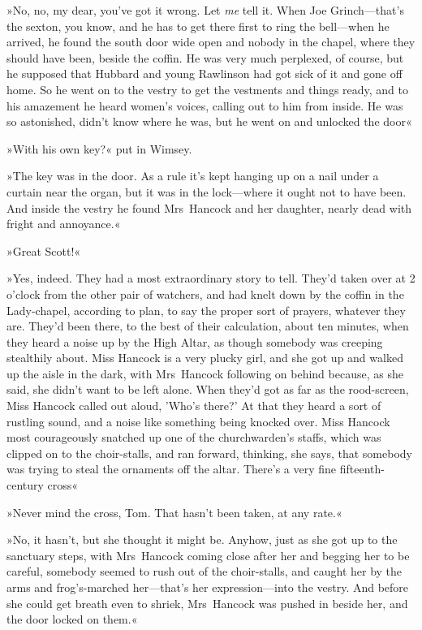 »No, no, my dear, you've got it wrong. Let \textit{me} tell it. When Joe Grinch—that's the sexton, you know, and he has to get there first to ring the bell—when he arrived, he found the south door wide open and nobody in the chapel, where they should have been, beside the coffin. He was very much perplexed, of course, but he supposed that Hubbard and young Rawlinson had got sick of it and gone off home. So he went on to the vestry to get the vestments and things ready, and to his amazement he heard women's voices, calling out to him from inside. He was so astonished, didn't know where he was, but he went on and unlocked the door\longdash«

»With his own key?« put in Wimsey.

»The key was in the door. As a rule it's kept hanging up on a nail under a curtain near the organ, but it was in the lock—where it ought not to have been. And inside the vestry he found Mrs~Hancock and her daughter, nearly dead with fright and annoyance.«

»Great Scott!«

»Yes, indeed. They had a most extraordinary story to tell. They'd taken over at 2 o'clock from the other pair of watchers, and had knelt down by the coffin in the Lady-chapel, according to plan, to say the proper sort of prayers, whatever they are. They'd been there, to the best of their calculation, about ten minutes, when they heard a noise up by the High Altar, as though somebody was creeping stealthily about. Miss Hancock is a very plucky girl, and she got up and walked up the aisle in the dark, with Mrs~Hancock following on behind because, as she said, she didn't want to be left alone. When they'd got as far as the rood-screen, Miss Hancock called out aloud, 'Who's there?' At that they heard a sort of rustling sound, and a noise like something being knocked over. Miss Hancock most courageously snatched up one of the churchwarden's staffs, which was clipped on to the choir-stalls, and ran forward, thinking, she says, that somebody was trying to steal the ornaments off the altar. There's a very fine fifteenth-century cross\longdash«

»Never mind the cross, Tom. That hasn't been taken, at any rate.«

»No, it hasn't, but she thought it might be. Anyhow, just as she got up to the sanctuary steps, with Mrs~Hancock coming close after her and begging her to be careful, somebody seemed to rush out of the choir-stalls, and caught her by the arms and frog's-marched her—that's her expression—into the vestry. And before she could get breath even to shriek, Mrs~Hancock was pushed in beside her, and the door locked on them.«

